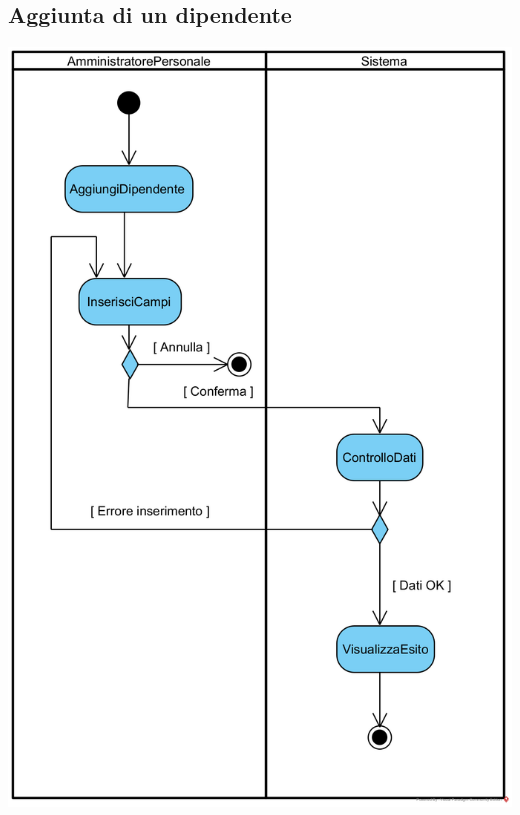 \documentclass[12pt]{article}
\begin{document}
\subsection{Aggiunta di un dipendente}
\begin{center}
\includegraphics[width=\textwidth]{ActivityDiagram/AmministratorePersonaleInserisceNuovoDipendente}
\end{center}
\end{document}
